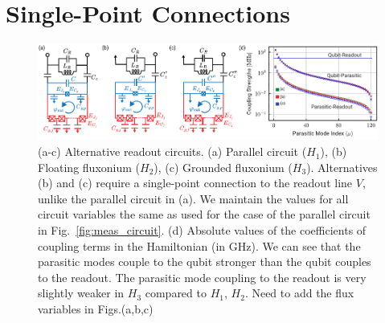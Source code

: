 \documentclass[%
reprint,
superscriptaddress,
 amsmath,amssymb,
 aps,
 prx,
longbibliography,
floatfix,
]{revtex4-2}
\begin{document}
\section{Single-Point Connections}\label{app:alt_circuits}
\begin{figure}[htb]
    \centering
    \includegraphics[width=\linewidth]{Supp_Fig/Circuit_choice.pdf}
    \caption{(a-c) Alternative readout circuits. (a) Parallel circuit ($H_1$), (b) Floating fluxonium ($H_2$), (c) Grounded fluxonium ($H_3$). Alternatives (b) and (c) require a single-point connection to the readout line $V$, unlike the parallel circuit in (a). We maintain the values for all circuit variables the same as used for the case of the parallel circuit in Fig.~\ref{fig:meas_circuit}. (d) Absolute values of the coefficients of coupling terms in the Hamiltonian (in GHz). We can see that the parasitic modes couple to the qubit stronger than the qubit couples to the readout. The parasitic mode coupling to the readout is very slightly weaker in $H_3$ compared to $H_1$, $H_2$. Need to add the flux variables in Figs.(a,b,c)}
    \label{fig:circuit_choice}
\end{figure}
\end{document}
